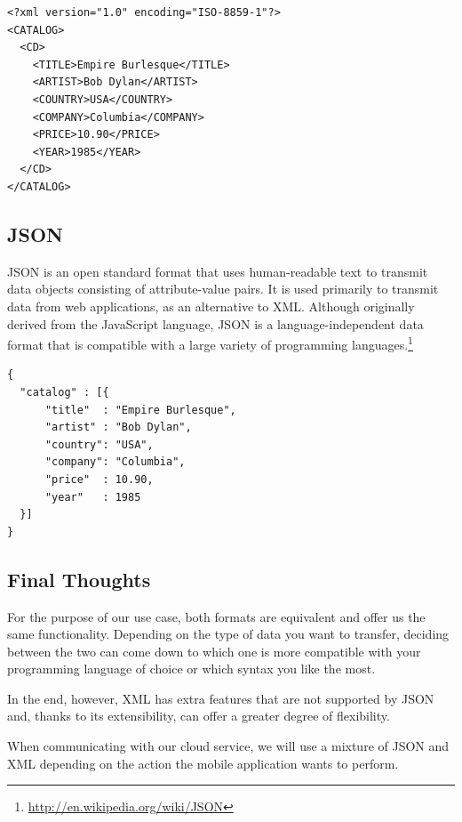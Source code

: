 \lstset{language=XML}
\begin{lstlisting}[frame=lt,caption=An XML example]
<?xml version="1.0" encoding="ISO-8859-1"?>
<CATALOG>
  <CD>
    <TITLE>Empire Burlesque</TITLE>
    <ARTIST>Bob Dylan</ARTIST>
    <COUNTRY>USA</COUNTRY>
    <COMPANY>Columbia</COMPANY>
    <PRICE>10.90</PRICE>
    <YEAR>1985</YEAR>
  </CD>
</CATALOG>

\end{lstlisting}

\subsection{JSON}

\ac{JSON} is an open standard format that uses human-readable text to transmit data objects consisting of attribute-value pairs. It is used primarily to transmit data from web applications, as an alternative to XML. Although originally derived from the JavaScript language, JSON is a language-independent data format that is compatible with a large variety of programming languages.\footnote{\url{http://en.wikipedia.org/wiki/JSON}}

\begin{lstlisting}[frame=lt,caption=A JSON example]
{ 
  "catalog" : [{
      "title"  : "Empire Burlesque",
      "artist" : "Bob Dylan",
      "country": "USA",
      "company": "Columbia",
      "price"  : 10.90,
      "year"   : 1985
  }]
}
\end{lstlisting}

\subsection{Final Thoughts}

For the purpose of our use case, both formats are equivalent and offer us the same functionality. Depending on the type of data you want to transfer, deciding between the two can come down to which one is more compatible with your programming language of choice or which syntax you like the most. 

In the end, however, \ac{XML} has extra features that are not supported by \ac{JSON} and, thanks to its extensibility, can offer a greater degree of flexibility.

When communicating with our cloud service, we will use a mixture of \ac{JSON} and \ac{XML} depending on the action the mobile application wants to perform. 



   
  




 
  